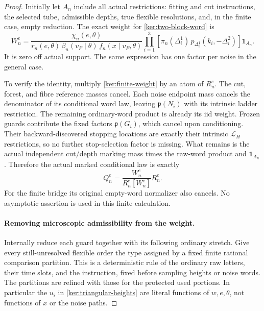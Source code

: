 \documentclass[11pt]{article}
\numberwithin{equation}{section}
\theoremstyle{definition}
\theoremstyle{remark}
\newcommand{\1}{\mathbf 1}
\begin{document}
\begin{proof}
Initially let \(A_n\) include all actual restrictions: fitting and
cut instructions, the selected tube, admissible depths, true flexible
resolutions, and, in the finite case, empty reduction.  The exact
weight for \eqref{ker:two-block-word} is
\begin{equation}\label{ker:finite-weight}
 W_n^e=
 \frac{\chi_n(e,\theta)}
 {r_n(e,\theta)\,\beta_n(v_F\mid\theta)\,
                         f_n(x\mid v_F,\theta)}
 \prod_{i=1}^{3}\!\left[
   \pi_n(\Delta_i^1)\,
   p_{\Delta_i^1}(k_i,-\Delta_i^2)\right]\mathbf 1_{A_n}.
\end{equation}
It is zero off actual support.  The same expression has one factor
per noise in the general case.

To verify the identity, multiply \eqref{ker:finite-weight} by an
atom of \(R_n^e\).  The cut, forest, and fibre reference masses cancel.
Each noise endpoint mass cancels the denominator of its conditional
word law, leaving \(\mathfrak p(N_i)\) with its intrinsic ladder
restriction.  The remaining ordinary-word product is already its
iid weight.  Frozen guards contribute the fixed factors
\(\mathfrak p(G_i)\), which cancel upon conditioning.  Their
backward-discovered stopping locations are exactly their intrinsic
\(\mathcal L_H\) restrictions, so no further stop-selection factor
is missing.  What remains is the actual independent cut/depth marking
mass times the raw-word product and \(\mathbf 1_{A_n}\).
Therefore the actual marked conditional law is exactly
\[
 Q_n^e=\frac{W_n^e}{R_n^e[W_n^e]}R_n^e.
\]
For the finite bridge its original empty-word normalizer also cancels.
No asymptotic assertion is used in this finite calculation.

\paragraph{Removing microscopic admissibility from the weight.}
Internally reduce each guard together with its following ordinary
stretch.  Give every still-unresolved flexible order the type assigned
by a fixed finite rational comparison partition.  This is a
deterministic rule of the ordinary raw letters, their time slots,
and the instruction, fixed before sampling heights or noise words.
The partitions are refined with those for the protected used portions.
In particular the \(u_i\) in \eqref{ker:triangular-heights} are literal
functions of \(w,e,\theta\), not functions of \(x\) or the noise paths.


\end{proof}
\end{document}
